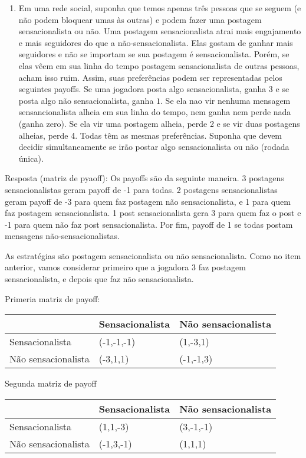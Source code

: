 \documentclass[
]{article}
\providecommand{\tightlist}{%
  \setlength{\itemsep}{0pt}\setlength{\parskip}{0pt}}
\begin{document}
\begin{enumerate}
\def\labelenumi{\arabic{enumi}.}
\setcounter{enumi}{7}
\tightlist
\item
  Em uma rede social, suponha que temos apenas três pessoas que se
  seguem (e não podem bloquear umas às outras) e podem fazer uma
  postagem sensacionalista ou não. Uma postagem sensacionalista atrai
  mais engajamento e mais seguidores do que a não-sensacionalista. Elas
  gostam de ganhar mais seguidores e não se importam se sua postagem é
  sensacionalista. Porém, se elas vêem em sua linha do tempo postagem
  sensacionalista de outras pessoas, acham isso ruim. Assim, suas
  preferências podem ser representadas pelos seguintes payoffs. Se uma
  jogadora posta algo sensacionalista, ganha \(3\) e se posta algo não
  sensacionalista, ganha \(1\). Se ela nao vir nenhuma mensagem
  sensancionalista alheia em sua linha do tempo, nem ganha nem perde
  nada (ganha zero). Se ela vir uma postagem alheia, perde 2 e se vir
  duas postagens alheias, perde 4. Todas têm as mesmas preferências.
  Suponha que devem decidir simultaneamente se irão postar algo
  sensacionalista ou não (rodada única).
\end{enumerate}

Resposta (matriz de pyaoff): Os payoffs são da seguinte maneira. 3
postagens sensacionalistas geram payoff de -1 para todas. 2 postagens
sensacionalistas geram payoff de -3 para quem faz postagem não
sensacionalista, e 1 para quem faz postagem sensacionalista. 1 post
sensacionalista gera 3 para quem faz o post e -1 para quem não faz post
sensacionalista. Por fim, payoff de 1 se todas postam mensagens
não-sensacionalistas.

As estratégias são postagem sensacionalista ou não sensacionalista. Como
no item anterior, vamos considerar primeiro que a jogadora 3 faz
postagem sensacionalista, e depois que faz não sensacionalista.

Primeria matriz de payoff:

\begin{longtable}[]{@{}lll@{}}
\toprule
& Sensacionalista & Não sensacionalista\tabularnewline
\midrule
\endhead
Sensacionalista & (-1,-1,-1) & (1,-3,1)\tabularnewline
Não sensacionalista & (-3,1,1) & (-1,-1,3)\tabularnewline
\bottomrule
\end{longtable}

Segunda matriz de payoff

\begin{longtable}[]{@{}lll@{}}
\toprule
& Sensacionalista & Não sensacionalista\tabularnewline
\midrule
\endhead
Sensacionalista & (1,1,-3) & (3,-1,-1)\tabularnewline
Não sensacionalista & (-1,3,-1) & (1,1,1)\tabularnewline
\bottomrule
\end{longtable}
\end{document}
